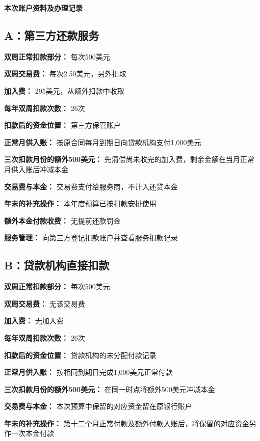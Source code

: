 \documentclass[UTF8,fontset=none,11pt,a4paper]{ctexart}
\begin{document}
{\noindent\fontsize{20}{25}\selectfont\bfseries 本次账户资料及办理记录\par}
\vspace{10pt}
\subsection*{A：第三方还款服务}
\textbf{双周正常扣款部分：} 每次500美元


\textbf{双周交易费：} 每次2.50美元，另外扣取


\textbf{加入费：} 295美元，从额外扣款中收取


\textbf{每年双周扣款次数：} 26次


\textbf{扣款后的资金位置：} 第三方保管账户


\textbf{正常月供入账：} 按原合同每月到期日向贷款机构支付1,000美元


\textbf{三次扣款月份的额外500美元：} 先清偿尚未收完的加入费，剩余金额在当月正常月供入账后冲减本金


\textbf{交易费与本金：} 交易费支付给服务商，不计入还贷本金


\textbf{年末的补充操作：} 本年度预算已按扣款安排使用


\textbf{额外本金付款收费：} 无提前还款罚金


\textbf{服务管理：} 向第三方登记扣款账户并查看服务扣款记录


\subsection*{B：贷款机构直接扣款}
\textbf{双周正常扣款部分：} 每次500美元


\textbf{双周交易费：} 无该交易费


\textbf{加入费：} 无加入费


\textbf{每年双周扣款次数：} 26次


\textbf{扣款后的资金位置：} 贷款机构的未分配付款记录


\textbf{正常月供入账：} 按相同到期日完成1,000美元正常付款


\textbf{三次扣款月份的额外500美元：} 在同一时点将额外500美元冲减本金


\textbf{交易费与本金：} 本次预算中保留的对应资金留在原银行账户


\textbf{年末的补充操作：} 第十二个月正常付款及额外付款入账后，将保留的对应资金另作一次本金付款
\end{document}
